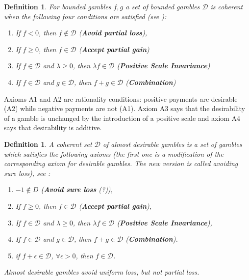 \documentclass{article}
\theoremstyle{mytheorem}
\newtheorem{definition}[theorem]{Definition}
\begin{document}
\begin{definition} \label{def:coherent}
For bounded gambles $f, g$ a set of bounded gambles $\mathcal{D}$ is \emph{coherent} when the following four conditions are satisfied (see \cite{pmlr-v147-wheeler21a}):
\begin{enumerate}
    \item [A1.] If $f < 0$, then $f \notin \mathcal{D}$ (\textbf{Avoid partial loss}),
    \item [A2.] If $f \geq 0$, then $f \in \mathcal{D}$ (\textbf{Accept partial gain})
    \item [A3.] If $f \in \mathcal{D}$ and $\lambda \geq 0$, then $\lambda f \in \mathcal{D}$ (\textbf{Positive Scale Invariance})
    \item [A4.] If $f \in \mathcal{D}$ and $g \in \mathcal{D}$, then $f + g \in \mathcal{D}$ (\textbf{Combination})
\end{enumerate}
\end{definition}
\noindent
Axioms A1 and A2 are rationality conditions: positive
payments are desirable (A2) while negative payments are
not (A1). Axiom A3 says that the desirability of a gamble
is unchanged by the introduction of a positive scale and
axiom A4 says that desirability is additive.

\begin{definition}
A \emph{coherent set $\mathcal{D}$ of almost desirable gambles} is a set
of gambles which satisfies the following axioms (the first one is a modification of the corresponding axiom for desirable gambles.
The new version is called avoiding sure loss), see \cite{Couso2009}:
\begin{enumerate}
    \item [D1'.] $-1 \notin D$ (\textbf{Avoid sure loss} (?)),
    \item [D2.] If $f \geq 0$, then $f \in \mathcal{D}$ (\textbf{Accept partial gain}),
    \item [D3.] If $f \in \mathcal{D}$ and $\lambda \geq 0$, then $\lambda f \in \mathcal{D}$ (\textbf{Positive Scale Invariance}),
    \item [D4.] If $f \in \mathcal{D}$ and $g \in \mathcal{D}$, then $f + g \in \mathcal{D}$ (\textbf{Combination}).
    \item [D5.] if $f + \epsilon \in \mathcal{D}$, $\forall \epsilon > 0$, then $f \in \mathcal{D}$.
\end{enumerate}
Almost desirable gambles avoid uniform loss, but not partial loss.
\end{definition}
\end{document}

